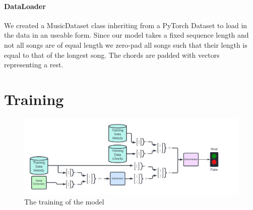 \paragraph{DataLoader} 
We created a MusicDataset class inheriting from a PyTorch Dataset to load in the data in an useable form.
Since our model takes a fixed sequence length and not all songs are of equal length we zero-pad all songs such that their length is equal to that of the longest song.
The chords are padded with vectors representing a rest.

\section{Training}

\begin{figure}
    \centering
    \includegraphics[width=0.8\columnwidth]{Figures/GAN}
    \decoRule
    \caption{The training of the model}
    \label{fig:ModelTraining}
\end{figure}

